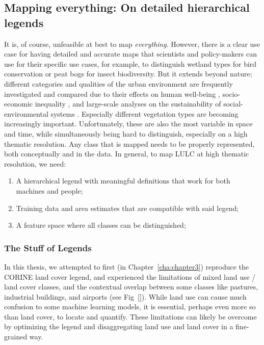     \subsection{Mapping everything: On detailed hierarchical legends}
    \label{syn:everything}

        It is, of course, unfeasible at best to map \textit{everything}. However, there is a clear use case for having detailed and accurate maps that scientists and policy-makers can use for their specific use cases, for example, to distinguish wetland types for bird conservation \citep{fan2021function} or peat bogs \citep{spitzer2006insect} for insect biodiversity. But it extends beyond nature; different categories and qualities of the urban environment are frequently investigated and compared due to their effects on human well-being \citep{krekel2016greener}, socio-economic inequality \citep{tian2024urban}, and large-scale analyses on the sustainability of social-environmental systems \citep{chen2022sustainability}. Especially different vegetation types are becoming increasingly important. Unfortunately, these are also the most variable in space and time, while simultaneously being hard to distinguish, especially on a high thematic resolution. Any class that is mapped needs to be properly represented, both conceptually and in the data. In general, to map LULC at high thematic resolution, we need:
        \begin{enumerate}
        \item A hierarchical legend with meaningful definitions that work for both machines and people;
        \item Training data and area estimates that are compatible with said legend;
        \item A feature space where all classes can be distinguished;
        \end{enumerate}

        \subsubsection{The Stuff of Legends}
        \label{syn:everything-legends}

        In this thesis, we attempted to first (in Chapter\@~\ref{cha:chapter3}) reproduce the CORINE land cover legend, and experienced the limitations of mixed land use / land cover classes, and the contextual overlap between some classes like pastures, industrial buildings, and airports (see Fig\@~\ref{}). While land use can cause much confusion to some machine learning models, it is essential, perhaps even more so than land cover, to locate and quantify. These limitations can likely be overcome by optimizing the legend and disaggregating land use and land cover in a fine-grained way.

